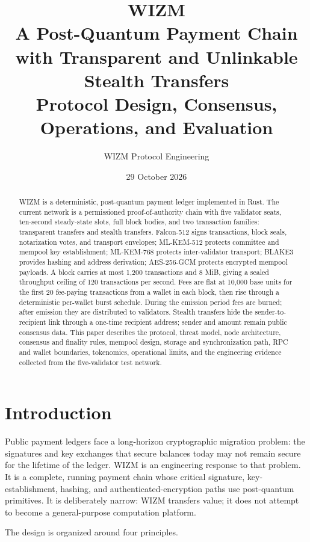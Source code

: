 \documentclass[11pt,a4paper]{article}
\title{\textbf{WIZM}\\[2mm]
\large A Post-Quantum Payment Chain with Transparent and Unlinkable Stealth Transfers\\[1mm]
\large Protocol Design, Consensus, Operations, and Evaluation}
\author{WIZM Protocol Engineering}
\date{29 October 2026}
\begin{document}
\maketitle

\begin{abstract}
WIZM is a deterministic, post-quantum payment ledger implemented in Rust. The
current network is a permissioned proof-of-authority chain with five validator
seats, ten-second steady-state slots, full block bodies, and two transaction
families: transparent transfers and stealth transfers. Falcon-512 signs
transactions, block seals, notarization votes, and transport envelopes;
ML-KEM-512 protects committee and mempool key establishment; ML-KEM-768
protects inter-validator transport; BLAKE3 provides hashing and address
derivation; AES-256-GCM protects encrypted mempool payloads. A block carries at
most 1,200 transactions and 8 MiB, giving a sealed throughput ceiling of
120 transactions per second. Fees are flat at 10,000 base units for the first
20 fee-paying transactions from a wallet in each block, then rise through a
deterministic per-wallet burst schedule. During the emission period fees are
burned; after emission they are distributed to validators. Stealth transfers
hide the sender-to-recipient link through a one-time recipient address;
sender and amount remain public consensus data. This paper describes the
protocol, threat model, node architecture, consensus and finality rules,
mempool design, storage and synchronization path, RPC and wallet boundaries,
tokenomics, operational limits, and the engineering evidence collected from
the five-validator test network.
\end{abstract}

\tableofcontents

\section{Introduction}

Public payment ledgers face a long-horizon cryptographic migration problem:
the signatures and key exchanges that secure balances today may not remain
secure for the lifetime of the ledger. WIZM is an engineering response to that
problem. It is a complete, running payment chain whose critical signature,
key-establishment, hashing, and authenticated-encryption paths use
post-quantum primitives. It is deliberately narrow: WIZM transfers value; it
does not attempt to become a general-purpose computation platform.

The design is organized around four principles.
\end{document}
